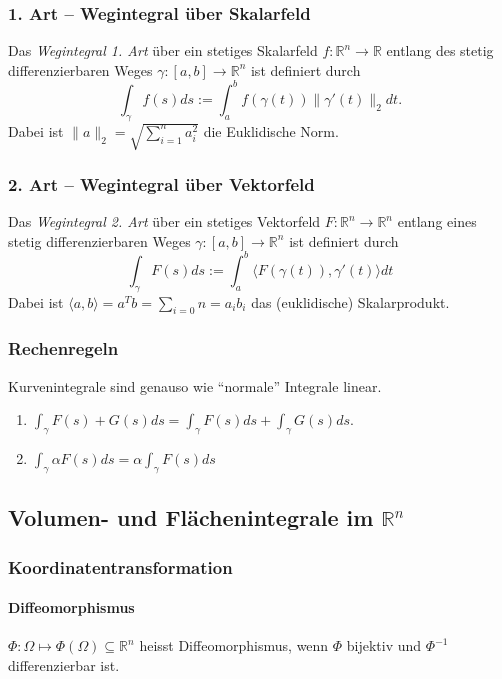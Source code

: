 \documentclass[a4paper, 9pt, DIV=24]{scrartcl}
\newcommand{\R}{\mathbb{R}}
\begin{document}
\subsubsection{1. Art -- Wegintegral über Skalarfeld}
Das \emph{Wegintegral 1. Art} über ein stetiges Skalarfeld $f: \R^n\rightarrow\R$ entlang des stetig differenzierbaren Weges $\gamma: [a,b]\rightarrow\R^n$
ist definiert durch
\[ \int_\gamma f(s)ds := \int_a^b f(\gamma(t))\|\gamma'(t)\|_2dt. \]
Dabei ist $\|a\|_2 = \sqrt{\sum_{i=1}^n a_i^2}$ die Euklidische Norm.

\subsubsection{2. Art -- Wegintegral über Vektorfeld}
Das \emph{Wegintegral 2. Art} über ein stetiges Vektorfeld $F: \R^n\rightarrow\R^n$ entlang eines stetig differenzierbaren Weges $\gamma: [a,b]\rightarrow\R^n$
ist definiert durch
\[ \int_\gamma F(s)ds := \int_a^b\langle F(\gamma(t)), \gamma'(t) \rangle dt\]
Dabei ist $\langle a,b \rangle = a^Tb = \sum_{i=0}{n} = a_ib_i$ das (euklidische) Skalarprodukt.

\subsubsection{Rechenregeln}
Kurvenintegrale sind genauso wie ``normale'' Integrale linear.
\begin{enumerate}[label={(}\arabic*{)}]
 \item $\int_\gamma F(s) + G(s)ds = \int_\gamma F(s)ds + \int_\gamma G(s)ds$.
 \item $\int_\gamma \alpha F(s)ds = \alpha\int_\gamma F(s)ds$
\end{enumerate}

\subsection{Volumen- und Flächenintegrale im $\R^n$}

\subsubsection{Koordinatentransformation}
\paragraph{Diffeomorphismus}
$\Phi: \Omega \mapsto \Phi(\Omega) \subseteq \R^n$ heisst Diffeomorphismus, wenn $\Phi$ bijektiv und $\Phi^{-1}$ differenzierbar ist.
\end{document}
